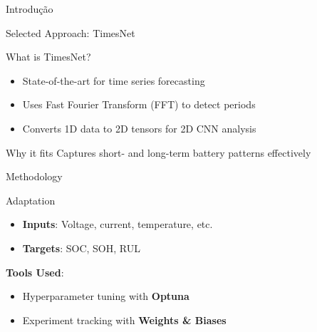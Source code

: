 \begin{frame}{Introdução}
\begin{frame}
\begin{frame}{Selected Approach: TimesNet}
  \begin{block}{What is TimesNet?}
    \begin{itemize}
      \item State-of-the-art for time series forecasting
      \item Uses Fast Fourier Transform (FFT) to detect periods
      \item Converts 1D data to 2D tensors for 2D CNN analysis
    \end{itemize}
  \end{block}
  
  \begin{exampleblock}{Why it fits}
    Captures short- and long-term battery patterns effectively
  \end{exampleblock}
  
  \vspace{0.5cm}
  
  \centering
\end{frame}

\begin{frame}{Methodology}
  \begin{block}{Adaptation}
    \begin{itemize}
      \item \textbf{Inputs}: Voltage, current, temperature, etc.
      \item \textbf{Targets}: SOC, SOH, RUL
    \end{itemize}
  \end{block}
  
  \vspace{0.3cm}
  
  \textbf{Tools Used}:
  \begin{itemize}
    \item Hyperparameter tuning with \textbf{Optuna}
    \item Experiment tracking with \textbf{Weights \& Biases}
  \end{itemize}
  

\end{frame}
\end{frame}
\end{frame}
